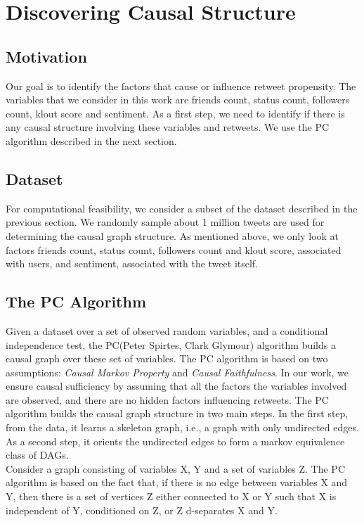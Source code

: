 
\section{Discovering Causal Structure}
\subsection{Motivation}
Our goal is to identify the factors that cause or influence retweet propensity. The variables that we consider in this work are friends count, status count, followers count, klout score and sentiment. As a first step, we need to identify if there is any causal structure involving  these variables and retweets. We use the PC algorithm described in the next section. 
\subsection{Dataset}
For computational feasibility, we consider a subset of the dataset described in the previous section. We randomly sample about 1 million tweets are used for determining the causal graph structure. As mentioned above, we only look at factors friends count, status count, followers count and klout score, associated with users, and sentiment, associated with the tweet itself.
\subsection{The PC Algorithm}
Given a dataset over a set of observed random variables, and a conditional independence test, the PC(Peter Spirtes, Clark Glymour) algorithm builds a causal graph over these set of variables. The PC algorithm is based on two assumptions: \textit{Causal Markov Property} and \textit{Causal Faithfulness}. In our work, we ensure causal sufficiency by assuming that all the factors the variables involved are observed, and there are no hidden factors influencing retweets.  The PC algorithm builds the causal graph structure in two main steps. In the first step, from the data, it learns a skeleton graph, i.e., a graph with only undirected edges. As a second step, it orients the undirected edges to form a markov equivalence class of DAGs. \\
Consider a graph consisting of variables X, Y and a set of variables Z. The PC algorithm is based on the fact that, if there is no edge between variables X and Y, then there is a set of vertices Z either connected to  X or Y such that X is independent of Y, conditioned on Z, or Z d-separates  X and Y. \\

